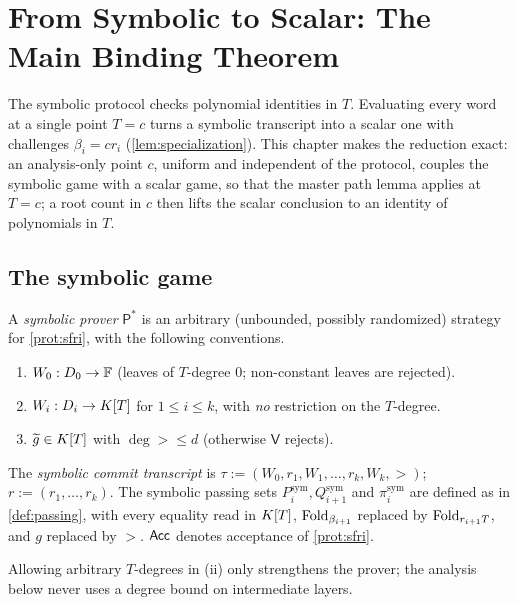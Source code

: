 \chapter{From Symbolic to Scalar: The Main Binding Theorem}
\label{ch:specialization}

The symbolic protocol checks polynomial identities in $T$. Evaluating every word at a
single point $T=c$ turns a symbolic transcript into a scalar one with challenges
$\beta_i=cr_i$ (\cref{lem:specialization}). This chapter makes the reduction exact: an
analysis-only point $c$, uniform and independent of the protocol, couples the symbolic
game with a scalar game, so that the master path lemma applies at $T=c$; a root count
in $c$ then lifts the scalar conclusion to an identity of polynomials in $T$.

\section{The symbolic game}

\begin{definition}\label{def:symbolic-game}
A \emph{symbolic prover} $\mathsf P^\ast$ is an arbitrary (unbounded, possibly
randomized) strategy for \cref{prot:sfri}, with the following conventions.
\begin{enumerate}[label=\textup{(\roman*)}]
\item $W_0:D_0\to\mathbb{F}$ (leaves of $T$-degree $0$; non-constant leaves are rejected).
\item $W_{i}:D_{i}\to K[T]$ for $1\le i\le k$, with \emph{no} restriction on the $T$-degree.
\item $\widetilde g\in K[T]$ with $\deg\gt\le d$ (otherwise $\mathsf V$ rejects).
\end{enumerate}
The \emph{symbolic commit transcript} is
$\tau:=(W_0,r_1,W_1,\dots,r_k,W_k,\gt)$; $r:=(r_1,\dots,r_k)$. The symbolic passing sets
$P_i^{\mathrm{sym}},Q_{i+1}^{\mathrm{sym}}$ and $\pi^{\mathrm{sym}}_i$ are defined as in
\cref{def:passing}, with every equality read in $K[T]$, $\mathrm{Fold}_{\beta_{i+1}}$ replaced by
$\mathrm{Fold}_{r_{i+1}T}$, and $g$ replaced by $\gt$. $\mathsf{Acc}$ denotes acceptance of
\cref{prot:sfri}.
\end{definition}

Allowing arbitrary $T$-degrees in (ii) only strengthens the prover; the analysis below
never uses a degree bound on intermediate layers.

